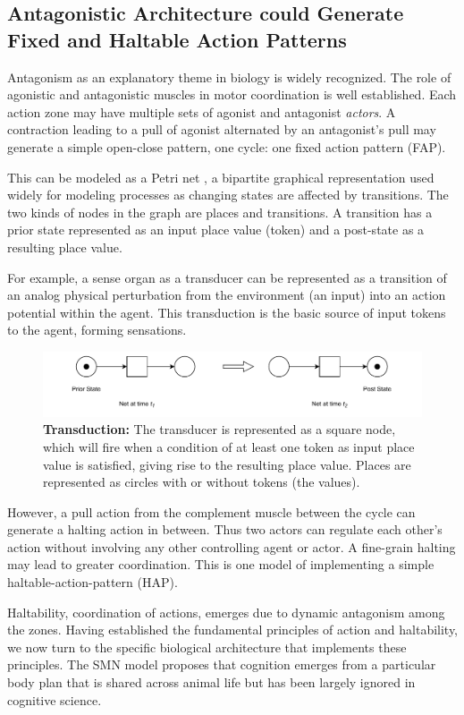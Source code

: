 \subsection{Antagonistic Architecture could Generate Fixed and Haltable Action Patterns}
Antagonism as an explanatory theme in biology is widely recognized. The role of agonistic and antagonistic muscles in motor coordination is well established. Each action zone may have multiple sets of agonist and antagonist \textit{actors}.  A contraction leading to a pull of agonist alternated by an antagonist's pull may generate a simple open-close pattern, one cycle: one fixed action pattern (FAP). 

This can be modeled as a Petri net \cite{peterson1977petri}, a bipartite graphical representation used widely for modeling processes as changing states are affected by transitions. The two kinds of nodes in the graph are places and transitions. A transition has a prior state represented as an input place value (token) and a post-state as a resulting place value. 

For example, a sense organ as a transducer can be represented as a transition of an analog physical perturbation from the environment (an input) into an action potential within the agent. This transduction is the basic source of input tokens to the agent, forming sensations.
\begin{figure}[ht] 
\includegraphics[width=\textwidth]{graphics/PN_Transduction.pdf}
\caption{\textbf{Transduction:
}The transducer is represented as a square node, which will fire when a condition of at least one token as input place value is satisfied, giving rise to the resulting place value.
Places are represented as circles with or without tokens (the values).}
\label{transduction}
\end{figure}


However, a pull action from the complement muscle between the cycle can generate a halting action in between.  Thus two actors can regulate each other's action without involving any other controlling agent or actor. A fine-grain halting may lead to greater coordination.  This is one model of implementing a simple haltable-action-pattern (HAP). 

Haltability, coordination of actions, emerges due to dynamic antagonism among the zones. Having established the fundamental principles of action and haltability, we now turn to the specific biological architecture that implements these principles. The SMN model proposes that cognition emerges from a particular body plan that is shared across animal life but has been largely ignored in cognitive science.

